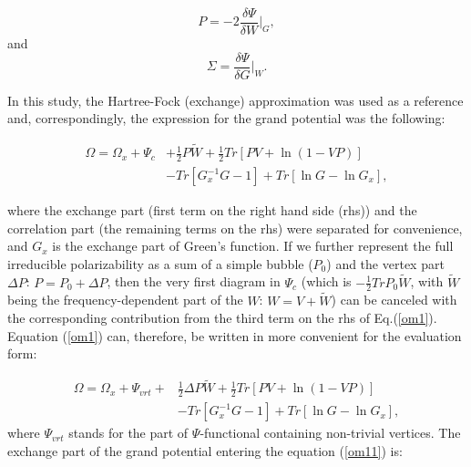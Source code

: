 \documentclass[aps,prb,floatfix,epsfig,twocolumn,preprintnumbers]{revtex4}
\begin{document}
\begin{equation}\label{om1b}
P=-2\frac{\delta \Psi}{\delta W}|_{G},
\end{equation}
and
\begin{equation}\label{om1c}
\Sigma=\frac{\delta \Psi}{\delta G}|_{W}.
\end{equation} 







In this study, the Hartree-Fock (exchange) approximation was used as a reference and, correspondingly, the expression for the grand potential was the following:

\begin{align}\label{om1}
\Omega=\Omega_{x}+\Psi_{c}&+\frac{1}{2}P\widetilde{W}+\frac{1}{2}Tr[PV+\ln(1-VP)]
\nonumber\\&-Tr[G^{-1}_{x}G-1]+Tr[\ln G-\ln G_{x}],
\end{align}

where the exchange part (first term on the right hand side (rhs)) and the correlation part (the remaining terms on the rhs) were separated for convenience, and $G_{x}$ is the exchange part of Green's function. If we further represent the full irreducible polarizability as a sum of a simple bubble ($P_{0}$) and the vertex part $\Delta P$: $P=P_{0}+\Delta P$, then the very first diagram in $\Psi_{c}$ (which is $-\frac{1}{2}TrP_{0}\widetilde{W}$, with $\widetilde{W}$ being the frequency-dependent part of the $W$: $W=V+\widetilde{W}$) can be canceled with the corresponding contribution from the third term on the rhs of Eq.(\ref{om1}). Equation (\ref{om1}) can, therefore, be written in more convenient for the evaluation form:

\begin{align}\label{om11}
\Omega=\Omega_{x}+\Psi_{vrt}+&\frac{1}{2}\Delta P\widetilde{W}+\frac{1}{2}Tr[PV+\ln(1-VP)]
\nonumber\\&-Tr[G^{-1}_{x}G-1]+Tr[\ln G-\ln G_{x}],
\end{align}
where $\Psi_{vrt}$ stands for the part of $\Psi$-functional containing non-trivial vertices. The exchange part of the grand potential entering the equation (\ref{om11}) is:
\end{document}

